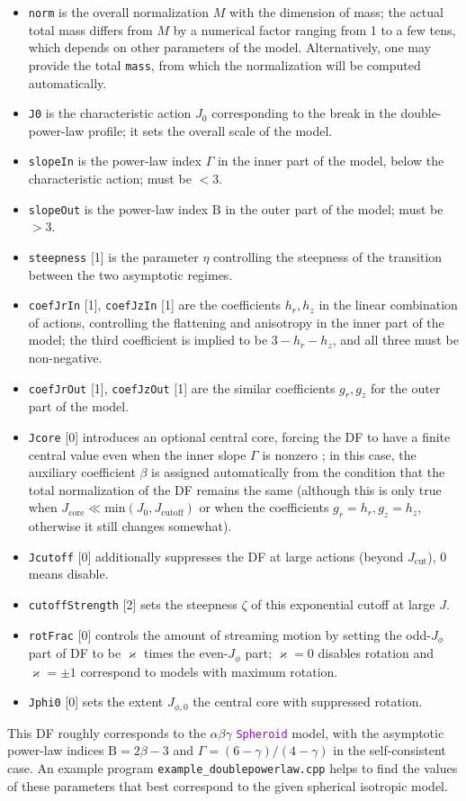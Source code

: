 \documentclass[12pt]{article}
\newcommand{\ttt}[1]{\textcolor{darkviolet}{\texttt{#1}}}
\newcommand{\ppp}[1]{\textcolor{darkolive} {\texttt{#1}}}
\newcommand{\Beta}{\mathrm B}
\begin{document}
\begin{itemize}
\item \ppp{norm} is the overall normalization $M$ with the dimension of mass; the actual total mass differs from $M$ by a numerical factor ranging from 1 to a few tens, which depends on other parameters of the model. Alternatively, one may provide the total \ppp{mass}, from which the normalization will be computed automatically.
\item \ppp{J0} is the characteristic action $J_0$ corresponding to the break in the double-power-law profile; it sets the overall scale of the model.
\item \ppp{slopeIn} is the power-law index $\Gamma$ in the inner part of the model, below the characteristic action; must be $<3$.
\item \ppp{slopeOut} is the power-law index $\Beta$ in the outer part of the model; must be $>3$.
\item \ppp{steepness} [1] is the parameter $\eta$ controlling the steepness of the transition between the two asymptotic regimes.
\item \ppp{coefJrIn} [1], \ppp{coefJzIn} [1] are the coefficients $h_r, h_z$ in the linear combination of actions, controlling the flattening and anisotropy in the inner part of the model; the third coefficient is implied to be $3-h_r-h_z$, and all three must be non-negative.
\item \ppp{coefJrOut} [1], \ppp{coefJzOut} [1] are the similar coefficients $g_r, g_z$ for the outer part of the model.
\item \ppp{Jcore} [0] introduces an optional central core, forcing the DF to have a finite central value even when the inner slope $\Gamma$ is nonzero \cite{ColeBinney2017}; in this case, the auxiliary coefficient $\beta$ is assigned automatically from the condition that the total normalization of the DF remains the same (although this is only true when $J_\mathrm{core}\ll \mathrm{min}(J_0, J_\mathrm{cutoff})$ or when the coefficients $g_r=h_r, g_z=h_z$, otherwise it still changes somewhat).
\item \ppp{Jcutoff} [0] additionally suppresses the DF at large actions (beyond $J_\mathrm{cut}$), 0  means disable.
\item \ppp{cutoffStrength} [2] sets the steepness $\zeta$ of this exponential cutoff at large $J$.
\item \ppp{rotFrac} [0] controls the amount of streaming motion by setting the odd-$J_\phi$ part of DF to be $\varkappa$ times the even-$J_\phi$ part; $\varkappa=0$ disables rotation and $\varkappa=\pm 1$ correspond to models with maximum rotation.
\item \ppp{Jphi0} [0] sets the extent $J_{\phi,0}$ the central core with suppressed rotation.
\end{itemize}
This DF roughly corresponds to the $\alpha\beta\gamma$ \ttt{Spheroid} model, with the asymptotic power-law indices $\Beta=2\beta-3$ and $\Gamma=(6-\gamma)/(4-\gamma)$ in the self-consistent case. An example program \texttt{example_doublepowerlaw.cpp} helps to find the values of these parameters that best correspond to the given spherical isotropic model.
\end{document}
